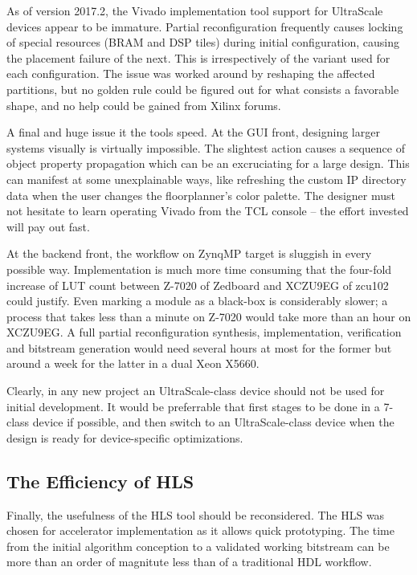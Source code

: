 As of version 2017.2,
the Vivado implementation tool support for UltraScale devices appear to be immature. Partial reconfiguration frequently
causes locking of special resources (BRAM and DSP tiles) during initial configuration, causing the placement failure of the next.
This is irrespectively of the variant used for each configuration. The issue was worked around by reshaping the affected partitions,
but no golden rule could be figured out for what consists a favorable shape, and no help could be gained from Xilinx forums.

A final and huge issue it the tools speed. At the GUI front, designing larger systems visually is virtually impossible.
The slightest action causes a sequence of object property propagation which can be an excruciating for a large design.
This can manifest at some unexplainable ways, like refreshing the custom IP directory data when the user changes the floorplanner's color palette.
The designer must not hesitate to learn operating Vivado from the TCL console -- the effort invested will pay out fast.

At the backend front, the workflow on ZynqMP target is sluggish in every possible way. Implementation is much more time consuming
that the four-fold increase of LUT count between Z-7020 of Zedboard and XCZU9EG of zcu102 could justify. Even marking a module
as a black-box is considerably slower; a process that takes less than a minute on Z-7020 would take more than an hour on XCZU9EG.
A full partial reconfiguration synthesis, implementation, verification and bitstream generation would need several hours at most
for the former but around a week for the latter in a dual Xeon X5660. 

Clearly, in any new project an UltraScale-class device should not be used for initial development.
It would be preferrable that first stages to be done in a 7-class device if possible,
and then switch to an UltraScale-class device when the design is ready for device-specific optimizations.

\subsection{The Efficiency of HLS}

Finally, the usefulness of the HLS tool should be reconsidered. The HLS was chosen for accelerator implementation as it
allows quick prototyping.
The time from the initial algorithm conception to a validated working bitstream can be more than an order
of magnitute less than of a traditional HDL workflow. 

